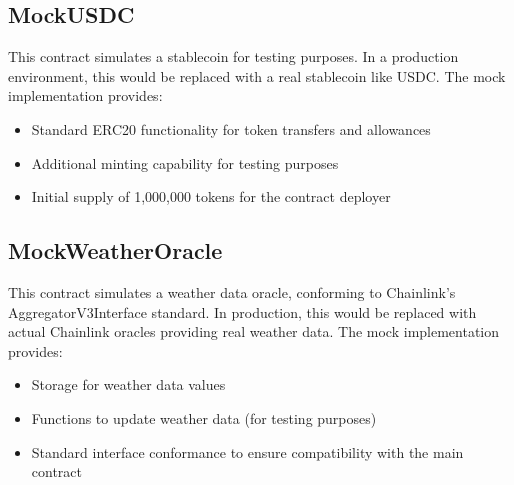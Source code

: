 \documentclass[11pt,a4paper]{article}
\begin{document}
		\subsection{MockUSDC}\label{subsec:analysis-mock-usdc}
		This contract simulates a stablecoin for testing purposes.
		In a production environment, this would be replaced with a real stablecoin like USDC. The mock implementation provides:

		\begin{itemize}
			\item Standard ERC20 functionality for token transfers and allowances
			\item Additional minting capability for testing purposes
			\item Initial supply of 1,000,000 tokens for the contract deployer
		\end{itemize}

		\subsection{MockWeatherOracle}\label{subsec:analysis-mock-weather-oracle}
		This contract simulates a weather data oracle, conforming to Chainlink's AggregatorV3Interface standard.
		In production, this would be replaced with actual Chainlink oracles providing real weather data.
		The mock implementation provides:

		\begin{itemize}
			\item Storage for weather data values
			\item Functions to update weather data (for testing purposes)
			\item Standard interface conformance to ensure compatibility with the main contract
		\end{itemize}

	
\end{document}
